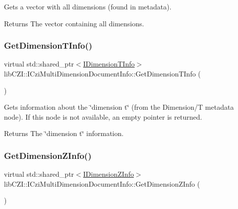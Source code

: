 Gets a vector with all dimensions (found in metadata). \begin{DoxyReturn}{Returns}
The vector containing all dimensions. 
\end{DoxyReturn}
\mbox{\label{classlib_c_z_i_1_1_i_czi_multi_dimension_document_info_a5b052b9eaa3b4e2dadb7ffe6e222006c}} 
\subsubsection{\texorpdfstring{Get\+Dimension\+T\+Info()}{GetDimensionTInfo()}}
{\footnotesize\ttfamily virtual std\+::shared\+\_\+ptr$<$\hyperlink{classlib_c_z_i_1_1_i_dimension_t_info}{I\+Dimension\+T\+Info}$>$ lib\+C\+Z\+I\+::\+I\+Czi\+Multi\+Dimension\+Document\+Info\+::\+Get\+Dimension\+T\+Info (\begin{DoxyParamCaption}{ }\end{DoxyParamCaption})\hspace{0.3cm}{\ttfamily [pure virtual]}}

Gets information about the \char`\"{}dimension t\char`\"{} (from the Dimension/T metadata node). If this node is not available, an empty pointer is returned. \begin{DoxyReturn}{Returns}
The \char`\"{}dimension t\char`\"{} information. 
\end{DoxyReturn}
\mbox{\label{classlib_c_z_i_1_1_i_czi_multi_dimension_document_info_a58fbba886729ac71ae4be8a75a6e96f5}} 
\subsubsection{\texorpdfstring{Get\+Dimension\+Z\+Info()}{GetDimensionZInfo()}}
{\footnotesize\ttfamily virtual std\+::shared\+\_\+ptr$<$\hyperlink{classlib_c_z_i_1_1_i_dimension_z_info}{I\+Dimension\+Z\+Info}$>$ lib\+C\+Z\+I\+::\+I\+Czi\+Multi\+Dimension\+Document\+Info\+::\+Get\+Dimension\+Z\+Info (\begin{DoxyParamCaption}{ }\end{DoxyParamCaption})\hspace{0.3cm}{\ttfamily [pure virtual]}}

